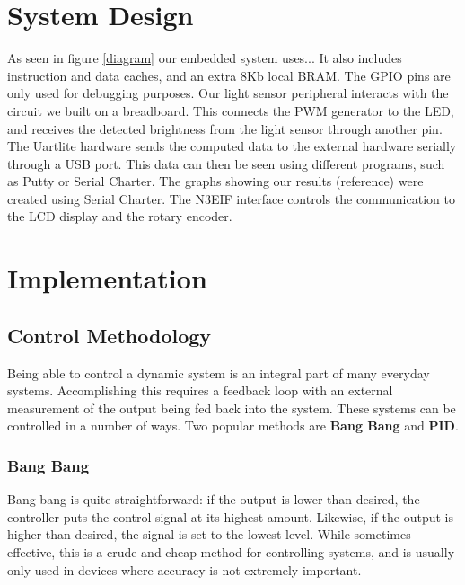 \documentclass[11pt]{article}
\begin{document}
\section{System Design}
As seen in figure \ref{diagram} our embedded system uses...
It also includes instruction and data caches, and an extra 
 8Kb local BRAM. 
 The GPIO pins are only used for debugging purposes.
 Our light sensor peripheral interacts with the circuit we built on a breadboard.  This connects the PWM generator to the LED, and receives the detected brightness from the light sensor through another pin. 
 The Uartlite hardware sends the computed data to the external hardware serially through a USB port.  This data can then be seen using different programs, such as Putty or Serial Charter.  The graphs showing our results (reference) were created using Serial Charter. 
 The N3EIF interface controls the communication to the LCD display and the rotary encoder.

\section{Implementation}

\subsection{Control Methodology}
Being able to control a dynamic system is an integral part of many everyday systems.  Accomplishing this requires a feedback loop with an external measurement of the output being fed back into the system.  These systems can be controlled in a number of ways.  Two popular methods are \textbf{Bang Bang} and \textbf{PID}.   

\subsubsection{Bang Bang} 
Bang bang is quite straightforward: if the output is lower than desired, the controller puts the control signal at its highest amount.  Likewise, if the output is higher than desired, the signal is set to the lowest level.  While sometimes effective, this is a crude and cheap method for controlling systems, and is usually only used in devices where accuracy is not extremely important. 

\vspace{12pt}
\end{document}
